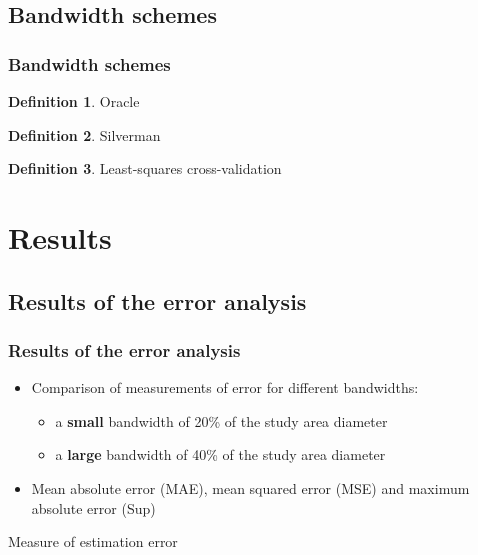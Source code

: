 \documentclass[notheorems]{beamer}
\theoremstyle{definition}
\newtheorem{definition}{Definition}
\theoremstyle{example}
\begin{document}
\subsection{Bandwidth schemes}
\begin{frame}\frametitle{Bandwidth schemes}
    \begin{definition}
        Oracle
    \end{definition}
    \begin{definition}
        Silverman
    \end{definition}
    \begin{definition}
        Least-squares cross-validation
    \end{definition}
\end{frame}


\section{Results}

\subsection{Results of the error analysis}
\begin{frame}\frametitle{Results of the error analysis}
    \begin{itemize}
        \item Comparison of measurements of error for different bandwidths:
        \begin{itemize}
            \item a \textbf{small} bandwidth of 20\% of the study area diameter
            \item a \textbf{large} bandwidth of 40\% of the study area diameter
        \end{itemize}
        \item Mean absolute error (MAE), mean squared error (MSE) and maximum absolute error (Sup)
    \end{itemize}
    \begin{table}{Measure of estimation error}
        \centering
    \end{table}
\end{frame}
\end{document}
